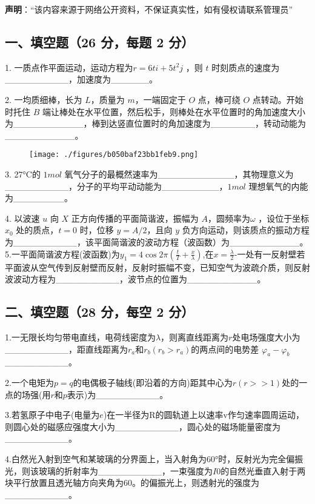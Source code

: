 
\textbf{声明}：“该内容来源于网络公开资料，不保证真实性，如有侵权请联系管理员”

\subsection{一、填空题（26 分，每题 2 分）}
1. 一质点作平面运动，运动方程为$r=6ti+5t^2j$ ，则 $t$ 时刻质点的速度为__________，加速度为______。

2. 一均质细棒，长为 $L$，质量为 $m$，一端固定于 $O$ 点，棒可绕 $O$ 点转动。开始时托住 $B$ 端让棒处在水平位置，然后松手，则棒处在水平位置时的角加速度大小为___________，棒到达竖直位置时的角加速度为_______，转动动能为___________。
\begin{figure}[ht]
\centering
\texttt{[image: ./figures/b050baf23bb1feb9.png]}
\caption{} \label{fig_NJU05_4}
\end{figure}
3. 27°C的 $1mol$ 氧气分子的最概然速率为____________，其物理意义为__________，分子的平均平动动能为_________，$1mol$ 理想氧气的内能为________。

4. 以波速 $u$ 向 $X$ 正方向传播的平面简谐波，振幅为 $A$，圆频率为$\omega$ ，设位于坐标 $x_0$ 处的质点，$t=0$ 时，位移 $y=A/2$，且向 $y$ 负方向运动，则该质点的振动方程为__________，该平面简谐波的波动方程（波函数）为___________。
5.一平面简谐波方程(波函数)为$y_1=4\cos2\pi(\frac{t}{T}+\frac{x}{\lambda})$,在$x=\frac{\lambda}{2}$-一处有一反射壁若平面波从空气传到反射壁而反射，反射时振幅不变，已知空气为波疏介质，则反射波波动方程为__________，波节点的位置为___________。
\subsection{二、填空题（28 分，每空 2 分）}
1.一无限长均匀带电直线，电荷线密度为$\lambda$，则离直线距离为$r$处电场强度大小为__________，距直线距离为$r_a$和$r_b(r_b>r_a)$的两点间的电势差 $\varphi_a-\varphi_b$__________。

2.一个电矩为$p=q$的电偶极子轴线(即沿着的方向)距其中心为$r(r>>1)$处的一点的场强(用$r$和$p$表示)为__________。

3.若氢原子中电子(电量为$e$)在一半径为R的圆轨道上以速率v作匀速率圆周运动，则圆心处的磁感应强度大小为__________，圆心处的磁场能量密度为__________。

4.白然光入射到空气和某玻璃的分界面上，当入射角为60°时，反射光为完全偏振光，则该玻璃的折射率为__________，一束强度为$I0$的自然光垂直入射于两块平行放置且透光轴方向夹角为60。的偏振光上，则透射光的强度为__________。

